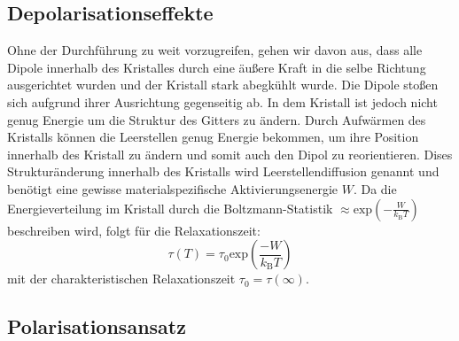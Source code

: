 	\subsection{Depolarisationseffekte}
		
		Ohne der Durchführung zu weit vorzugreifen, gehen wir davon aus, dass alle Dipole innerhalb des Kristalles durch eine äußere Kraft in die selbe Richtung ausgerichtet wurden und der Kristall stark abegkühlt wurde.
		Die Dipole stoßen sich aufgrund ihrer Ausrichtung gegenseitig ab. In dem Kristall ist jedoch nicht genug Energie um die Struktur des Gitters zu ändern.
		Durch Aufwärmen des Kristalls können die Leerstellen genug Energie bekommen, um ihre Position innerhalb des Kristall zu ändern und somit auch den Dipol zu reorientieren.
		Dises Strukturänderung innerhalb des Kristalls wird Leerstellendiffusion genannt und benötigt eine gewisse materialspezifische Aktivierungsenergie $W$.
		Da die Energieverteilung im Kristall durch die Boltzmann-Statistik $\approx\text{exp}\left(-\frac{W}{k_\text{B}T}\right)$ beschreiben wird, folgt für die Relaxationszeit:\\
		\begin{equation}
			\tau(T) = \tau_0 \text{exp}\left(\frac{-W}{k_\text{B}T}\right)
			\label{eqn:tau0}
		\end{equation}
		mit der charakteristischen Relaxationszeit $\tau_0 = \tau(\infty)$.

	\subsection{Polarisationsansatz}

